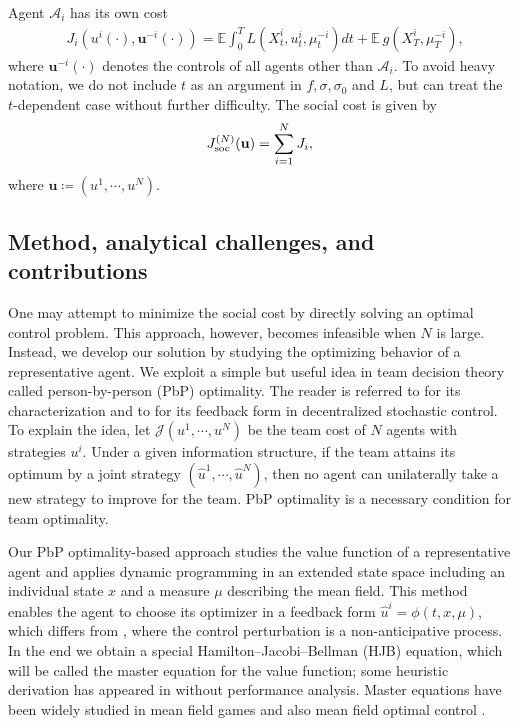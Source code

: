 \documentclass{amsart}
\theoremstyle{definition}
\theoremstyle{remark}
\def\cal{\mathcal}
\def\EE{{\mathbb E}}
\numberwithin{equation}{section}
\begin{document}
Agent ${\cal A}_i$ has its own cost
\begin{align}
&J_i(u^i(\cdot), {\mathbf u}^{-i}(\cdot)) =\EE\int_0^T L(X_t^i, u_t^i, \mu_{t}^{-i}) dt +\EE\ g(X_T^i, \mu_T^{-i}),\label{cosXi}
\end{align}
where  ${\mathbf u}^{-i}(\cdot)$  denotes the controls of all agents other than ${\cal A}_i$. To avoid heavy notation,  we do not include $t$ as an argument in $f, \sigma, \sigma_0$ and  $L$, but can treat the $t$-dependent case  without further difficulty.
The social cost is given by
\begin{align}\label{jsocN}
J_{\rm soc }^{(N)}(\mathbf{u})= \sum_{i=1}^N J_i,
\end{align}
where ${\mathbf u}\coloneqq (u^1, \cdots, u^N)$.



\subsection{Method, analytical challenges, and contributions}

One may attempt to
minimize  the social cost by directly solving an optimal control problem. This approach, however, becomes infeasible  when $N$ is  large.
Instead, we develop our solution by studying the optimizing behavior of a representative agent.
We exploit a simple but useful idea in team decision theory called person-by-person (PbP) optimality. The reader is referred to \cite{H80,SM76,WS00} for its characterization and to \cite{CA18} for its feedback form in decentralized stochastic control.  To explain the idea, let ${\mathcal J}(u^1, \cdots, u^N)$ be the team cost of $N$ agents with strategies $u^i$. Under a given information structure, if the team   attains its optimum by a joint strategy $(\hat u^1, \cdots, \hat u^N)$, then no agent can unilaterally take a new strategy to improve for the team. PbP optimality is a necessary condition for team optimality.




Our  PbP optimality-based approach studies the value function of a representative agent and applies dynamic programming in an extended state space including an individual state $x$ and a measure $\mu$ describing the mean field.
This method enables the agent to choose its optimizer in a feedback form $\hat u^i= \phi(t, x, \mu)$, which differs from \cite{SHM16}, where the control perturbation is
a non-anticipative process. In the end we obtain a special Hamilton--Jacobi--Bellman (HJB) equation, which will be called the master equation for the value function; some heuristic derivation has appeared in \cite{HSS20} without performance analysis. Master equations have been widely studied in mean field games \cite{BFY13,CDLL19,CD18} and also mean field optimal control \cite{BCP18,BFY13,DPT22,PW17}.
\end{document}
